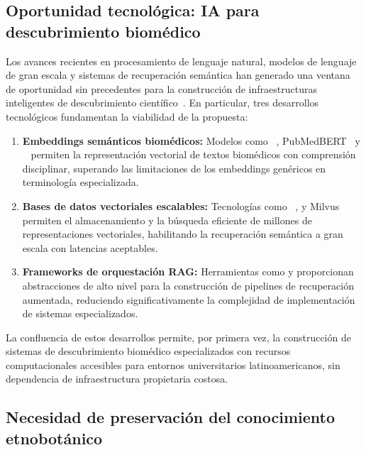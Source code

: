 \subsection{Oportunidad tecnológica: IA para descubrimiento biomédico}
\label{subsec:tech_opportunity}

Los avances recientes en procesamiento de lenguaje natural, modelos de lenguaje de gran escala y sistemas de recuperación semántica han generado una ventana de oportunidad sin precedentes para la construcción de infraestructuras inteligentes de descubrimiento científico~\cite{zhao2023survey}. En particular, tres desarrollos tecnológicos fundamentan la viabilidad de la propuesta:

\begin{enumerate}[label=(\roman*)]
  \item \textbf{Embeddings semánticos biomédicos:} Modelos como \biobert{}~\cite{lee2020biobert}, PubMedBERT~\cite{gu2021domain} y \scispacy{}~\cite{neumann2019scispacy} permiten la representación vectorial de textos biomédicos con comprensión disciplinar, superando las limitaciones de los embeddings genéricos en terminología especializada.

  \item \textbf{Bases de datos vectoriales escalables:} Tecnologías como \faiss{}~\cite{johnson2021billion}, \chromadb{} y Milvus permiten el almacenamiento y la búsqueda eficiente de millones de representaciones vectoriales, habilitando la recuperación semántica a gran escala con latencias aceptables.

  \item \textbf{Frameworks de orquestación RAG:} Herramientas como \langchain{} y \llamaindex{} proporcionan abstracciones de alto nivel para la construcción de pipelines de recuperación aumentada, reduciendo significativamente la complejidad de implementación de sistemas \rag{} especializados.
\end{enumerate}

La confluencia de estos desarrollos permite, por primera vez, la construcción de sistemas de descubrimiento biomédico especializados con recursos computacionales accesibles para entornos universitarios latinoamericanos, sin dependencia de infraestructura propietaria costosa.

\subsection{Necesidad de preservación del conocimiento etnobotánico}
\label{subsec:preservation}

